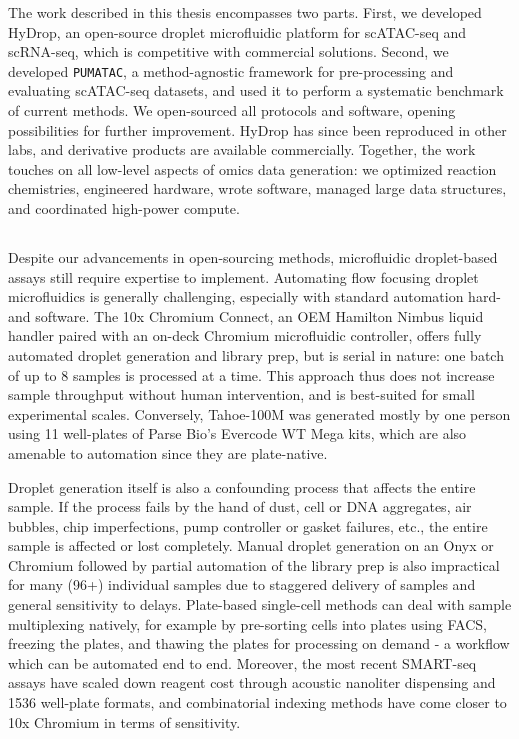 The work described in this thesis encompasses two parts. First, we developed HyDrop, an open-source droplet microfluidic platform for scATAC-seq and scRNA-seq, which is competitive with commercial solutions. Second, we developed \texttt{PUMATAC}, a method-agnostic framework for pre-processing and evaluating scATAC-seq datasets, and used it to perform a systematic benchmark of current methods. We open-sourced all protocols and software, opening possibilities for further improvement. HyDrop has since been reproduced in other labs, and derivative products are available commercially. Together, the work touches on all low-level aspects of omics data generation: we optimized reaction chemistries, engineered hardware, wrote software, managed large data structures, and coordinated high-power compute.

\subsection*{}

Despite our advancements in open-sourcing methods, microfluidic droplet-based assays still require expertise to implement. Automating flow focusing droplet microfluidics is generally challenging, especially with standard automation hard- and software. The 10x Chromium Connect, an OEM Hamilton Nimbus liquid handler paired with an on-deck Chromium microfluidic controller, offers fully automated droplet generation and library prep, but is serial in nature: one batch of up to 8 samples is processed at a time. This approach thus does not increase sample throughput without human intervention, and is best-suited for small experimental scales. Conversely, Tahoe-100M was generated mostly by one person using 11 well-plates of Parse Bio's Evercode WT Mega kits, which are also amenable to automation since they are plate-native.

Droplet generation itself is also a confounding process that affects the entire sample. If the process fails by the hand of dust, cell or DNA aggregates, air bubbles, chip imperfections, pump controller or gasket failures, etc., the entire sample is affected or lost completely. Manual droplet generation on an Onyx or Chromium followed by partial automation of the library prep is also impractical for many (96+) individual samples due to staggered delivery of samples and general sensitivity to delays. Plate-based single-cell methods can deal with sample multiplexing natively, for example by pre-sorting cells into plates using FACS, freezing the plates, and thawing the plates for processing on demand - a workflow which can be automated end to end. Moreover, the most recent SMART-seq assays have scaled down reagent cost through acoustic nanoliter dispensing and \mbox{\num{1536}} well-plate formats, and combinatorial indexing methods have come closer to 10x Chromium in terms of sensitivity.

